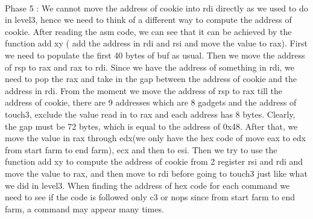 \documentclass[a4paper]{article}
\begin{document}
\paragraph{}
Phase 5 : 
We cannot move the address of cookie into rdi directly as we used to do in level3, hence we need to think of a different way to compute the address of cookie. After reading the asm code, we can see that it can be achieved by the function add xy ( add the address in rdi and rsi and move the value to rax). First we need to populate the first 40 bytes of buf as usual. Then we move the address of rsp to rax and rax to rdi. Since we have the address of something in rdi, we need to pop the rax and take in the gap between the address of cookie and the address in rdi. From the moment we move the address of rsp to rax till the address of cookie, there are 9 addresses which are 8 gadgets and the address of touch3, exclude the value read in to rax and each address has 8 bytes. Clearly, the gap must be 72 bytes, which is equal to the address of 0x48. After that, we move the value in rax through edx(we only have the hex code of move eax to edx from start farm to end farm), ecx and then to esi. Then we try to use the function add xy to compute the address of cookie from 2 register rsi and rdi and move the value to rax, and then move to rdi before going to touch3  just like what we did in level3. When finding the address of hex code for each command we need to see if the code is followed only c3 or nops since from start farm to end farm, a command may appear many times.
\paragraph{}


\clearpage
\end{document}
